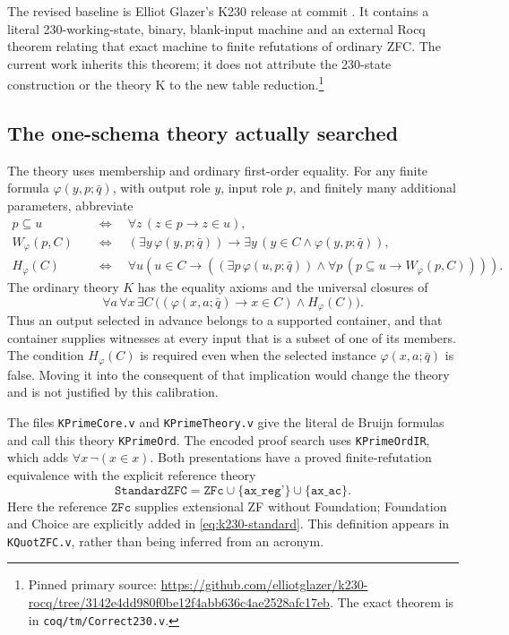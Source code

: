 The revised baseline is Elliot Glazer's K230 release at commit
.
It contains a literal 230-working-state, binary, blank-input machine
and an external Rocq theorem relating that exact machine to finite
refutations of ordinary ZFC.  The current work inherits this theorem;
it does not attribute the 230-state construction or the theory K
to the new table reduction.\footnote{Pinned primary source:
\url{https://github.com/elliotglazer/k230-rocq/tree/3142e4dd980f0be12f4abb636c4ae2528afc17eb}.
The exact theorem is in \texttt{coq/tm/Correct230.v}.}

\subsection{The one-schema theory actually searched}

The theory uses membership and ordinary first-order equality.
For any finite formula $\varphi(y,p;\bar q)$, with output role $y$,
input role $p$, and finitely many additional parameters, abbreviate
\begin{align*}
 p\subseteq u&\quad\Longleftrightarrow\quad
      \forall z\,(z\in p\to z\in u),\\
 W_\varphi(p,C)&\quad\Longleftrightarrow\quad
      (\exists y\,\varphi(y,p;\bar q))\to
          \exists y\,(y\in C\land\varphi(y,p;\bar q)),\\
 H_\varphi(C)&\quad\Longleftrightarrow\quad
      \forall u\left(u\in C\to
        \left((\exists p\,\varphi(u,p;\bar q))\land
          \forall p\,(p\subseteq u\to W_\varphi(p,C))\right)\right).
\end{align*}
The ordinary theory $K$ has the equality axioms and the universal
closures of
\begin{equation}
 \forall a\,\forall x\,\exists C\,
       \bigl((\varphi(x,a;\bar q)\to x\in C)\land H_\varphi(C)\bigr).
 \label{eq:k230-schema}
\end{equation}
Thus an output selected in advance belongs to a supported container,
and that container supplies witnesses at every input that is a subset
of one of its members.  The condition $H_\varphi(C)$ is required
even when the selected instance $\varphi(x,a;\bar q)$ is false.
Moving it into the consequent of that implication would change
the theory and is not justified by this calibration.

The files \texttt{KPrimeCore.v} and \texttt{KPrimeTheory.v} give
the literal de Bruijn formulas and call this theory
\texttt{KPrimeOrd}.  The encoded proof search uses
\texttt{KPrimeOrdIR}, which adds
$\forall x\,\neg(x\in x)$.  Both presentations have a proved
finite-refutation equivalence with the explicit reference theory
\begin{equation}
 \texttt{StandardZFC}
       =\texttt{ZFc}\cup\{\texttt{ax\_reg'}\}
                    \cup\{\texttt{ax\_ac}\}.
 \label{eq:k230-standard}
\end{equation}
Here the reference $\texttt{ZFc}$ supplies extensional ZF without
Foundation; Foundation and Choice are explicitly added in
\eqref{eq:k230-standard}.  This definition appears in
\texttt{KQuotZFC.v}, rather than being inferred from an acronym.

